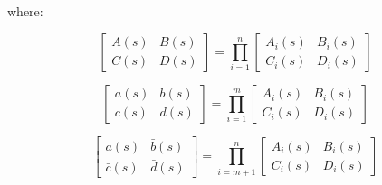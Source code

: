 where:

\begin{equation}
\left[ {\begin{array}{*{20}{c}}{A\left( s \right)}&{B\left( s \right)}\\ {C\left( s \right)}&{D\left( s \right)}\end{array}} \right] = \prod\limits_{i = 1}^n {\left[ {\begin{array}{*{20}{c}}{{A_i}\left( s \right)}&{{B_i}\left( s \right)}\\ {{C_i}\left( s \right)}&{{D_i}\left( s \right)}\end{array}} \right]}
\end{equation}

\begin{equation}
\left[ {\begin{array}{*{20}{c}}{a\left( s \right)}&{b\left( s \right)}\\ {c\left( s \right)}&{d\left( s \right)}\end{array}} \right] = \prod\limits_{i = 1}^m {\left[ {\begin{array}{*{20}{c}}{{A_i}\left( s \right)}&{{B_i}\left( s \right)}\\ {{C_i}\left( s \right)}&{{D_i}\left( s \right)}\end{array}} \right]}
\end{equation}

\begin{equation}
\left[ {\begin{array}{*{20}{c}}{\bar a\left( s \right)}&{\bar b\left( s \right)}\\ {\bar c\left( s \right)}&{\bar d\left( s \right)}\end{array}} \right] = \prod\limits_{i = m + 1}^n {\left[ {\begin{array}{*{20}{c}}{{A_i}\left( s \right)}&{{B_i}\left( s \right)}\\ {{C_i}\left( s \right)}&{{D_i}\left( s \right)}\end{array}} \right]}
\end{equation}

